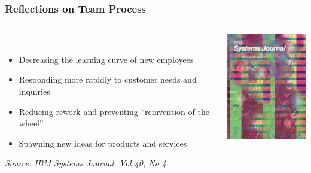\begin{frame}
  \frametitle{Reflections on Team Process}
  \begin{columns}
    \begin{column}{0.7\textwidth}
      \begin{description}[]
        \item[Four Areas of Organizational Performance] \hfill \\
        \begin{itemize}
          \item Decreasing the learning curve of new employees
          \item Responding more rapidly to customer needs and inquiries
          \item Reducing rework and preventing “reinvention of the wheel”
          \item Spawning new ideas for products and services
        \end{itemize}
        \it{Source: IBM Systems Journal, Vol 40, No 4}
      \end{description}
    \end{column}
    \begin{column}{0.3\textwidth}
      \includegraphics[width=.9\textwidth]{images/ibm.jpg}
    \end{column}
  \end{columns}
\end{frame}

